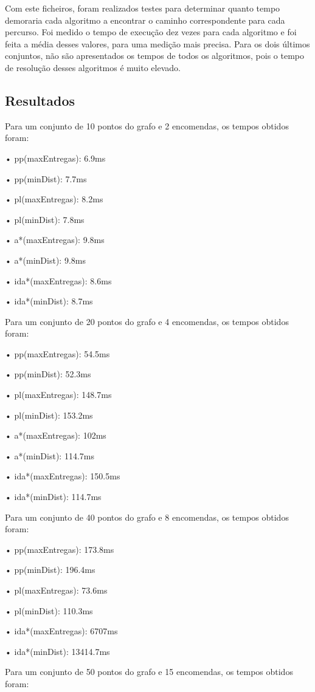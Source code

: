 \documentclass[a4paper]{article}
\begin{document}
Com este ficheiros, foram realizados testes para determinar quanto tempo demoraria cada algoritmo a encontrar o caminho correspondente para cada percurso. Foi medido o tempo de execução dez vezes para cada algoritmo e foi feita a média desses valores, para uma medição mais precisa. Para os dois últimos conjuntos, não são apresentados os tempos de todos os algoritmos, pois o tempo de resolução desses algoritmos é muito elevado.
\subsection{Resultados}
Para um conjunto de 10 pontos do grafo e 2 encomendas, os tempos obtidos foram:

	• pp(maxEntregas): 6.9ms

	• pp(minDist): 7.7ms

	• pl(maxEntregas): 8.2ms

	• pl(minDist): 7.8ms

	• a*(maxEntregas): 9.8ms

	• a*(minDist): 9.8ms

	• ida*(maxEntregas): 8.6ms

	• ida*(minDist): 8.7ms
\newline

Para um conjunto de 20 pontos do grafo e 4 encomendas, os tempos obtidos foram:

	• pp(maxEntregas): 54.5ms

	• pp(minDist): 52.3ms

	• pl(maxEntregas): 148.7ms

	• pl(minDist): 153.2ms

	• a*(maxEntregas): 102ms

	• a*(minDist): 114.7ms

	• ida*(maxEntregas): 150.5ms

	• ida*(minDist): 114.7ms
\newline

Para um conjunto de 40 pontos do grafo e 8 encomendas, os tempos obtidos foram:

	• pp(maxEntregas): 173.8ms

	• pp(minDist): 196.4ms

	• pl(maxEntregas): 73.6ms

	• pl(minDist): 110.3ms

	• ida*(maxEntregas): 6707ms

	• ida*(minDist): 13414.7ms
\newline

Para um conjunto de 50 pontos do grafo e 15 encomendas, os tempos obtidos foram:
\end{document}
